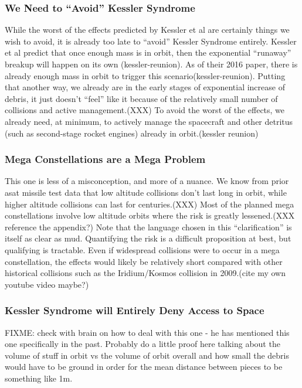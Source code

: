 \subsubsection{We Need to ``Avoid'' Kessler Syndrome}
While the worst of the effects predicted by Kessler et al are
certainly things we wish to avoid, it is already too late to ``avoid''
Kessler Syndrome entirely.  Kessler et al predict that once enough
mass is in orbit, then the exponential ``runaway'' breakup will happen
on its own (kessler-reunion).  As of their 2016 paper, there is
already enough mass in orbit to trigger this
scenario(kessler-reunion).  Putting that another way, we already are
in the early stages of exponential increase of debris, it just doesn't
``feel'' like it because of the relatively small number of collisions
and active management.(XXX) To avoid the worst of the effects, we
already need, at minimum, to actively manage the spacecraft and other
detritus (such as second-stage rocket engines) already in
orbit.(kessler reunion)

\subsubsection{Mega Constellations are a Mega Problem}
This one is less of a misconception, and more of a nuance.  We know
from prior \ac{asat} missile test data that low altitude collisions
don't last long in orbit, while higher altitude collisions can last
for centuries.(XXX) Most of the planned mega constellations involve
low altitude orbits where the risk is greatly lessened.(XXX reference
the appendix?)  Note that the language chosen in this
``clarification'' is itself as clear as mud.  Quantifying the risk is
a difficult proposition at best, but qualifying is tractable.  Even if
widespread collisions were to occur in a mega constellation, the
effects would likely be relatively short compared with other
historical collisions such as the Iridium/Kosmos collision in
2009.(cite my own youtube video maybe?)

\subsubsection{Kessler Syndrome will Entirely Deny Access to Space}
FIXME: check with brain on how to deal with this one - he has
mentioned this one specifically in the past.  Probably do a little
proof here talking about the volume of stuff in orbit vs the volume of
orbit overall and how small the debris would have to be ground in
order for the mean distance between pieces to be something like 1m.


